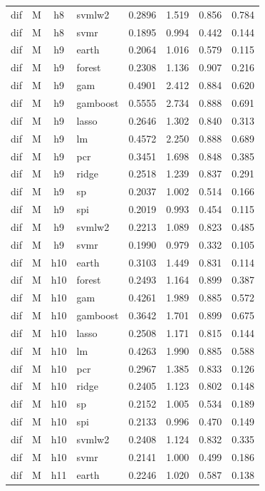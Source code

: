 \begin{ThreePartTable}
\begin{longtable}[t]{llclcccc}
dif & M & h8 & svmlw2 & 0.2896 & 1.519 & 0.856 & 0.784\\
dif & M & h8 & svmr & 0.1895 & 0.994 & 0.442 & 0.144\\
\addlinespace
dif & M & h9 & earth & 0.2064 & 1.016 & 0.579 & 0.115\\
dif & M & h9 & forest & 0.2308 & 1.136 & 0.907 & 0.216\\
dif & M & h9 & gam & 0.4901 & 2.412 & 0.884 & 0.620\\
dif & M & h9 & gamboost & 0.5555 & 2.734 & 0.888 & 0.691\\
dif & M & h9 & lasso & 0.2646 & 1.302 & 0.840 & 0.313\\
dif & M & h9 & lm & 0.4572 & 2.250 & 0.888 & 0.689\\
dif & M & h9 & pcr & 0.3451 & 1.698 & 0.848 & 0.385\\
dif & M & h9 & ridge & 0.2518 & 1.239 & 0.837 & 0.291\\
dif & M & h9 & sp & 0.2037 & 1.002 & 0.514 & 0.166\\
dif & M & h9 & spi & 0.2019 & 0.993 & 0.454 & 0.115\\
dif & M & h9 & svmlw2 & 0.2213 & 1.089 & 0.823 & 0.485\\
dif & M & h9 & svmr & 0.1990 & 0.979 & 0.332 & 0.105\\
\addlinespace
dif & M & h10 & earth & 0.3103 & 1.449 & 0.831 & 0.114\\
dif & M & h10 & forest & 0.2493 & 1.164 & 0.899 & 0.387\\
dif & M & h10 & gam & 0.4261 & 1.989 & 0.885 & 0.572\\
dif & M & h10 & gamboost & 0.3642 & 1.701 & 0.899 & 0.675\\
dif & M & h10 & lasso & 0.2508 & 1.171 & 0.815 & 0.144\\
dif & M & h10 & lm & 0.4263 & 1.990 & 0.885 & 0.588\\
dif & M & h10 & pcr & 0.2967 & 1.385 & 0.833 & 0.126\\
dif & M & h10 & ridge & 0.2405 & 1.123 & 0.802 & 0.148\\
dif & M & h10 & sp & 0.2152 & 1.005 & 0.534 & 0.189\\
dif & M & h10 & spi & 0.2133 & 0.996 & 0.470 & 0.149\\
dif & M & h10 & svmlw2 & 0.2408 & 1.124 & 0.832 & 0.335\\
dif & M & h10 & svmr & 0.2141 & 1.000 & 0.499 & 0.186\\
\addlinespace
dif & M & h11 & earth & 0.2246 & 1.020 & 0.587 & 0.138\\

\end{longtable}
\end{ThreePartTable}
